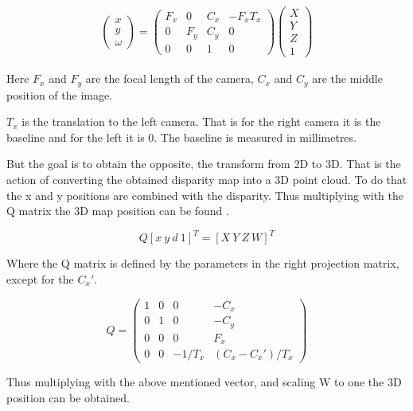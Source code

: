 \begin{equation}\label{eq:projection}
 \begin{split}
  \begin{pmatrix}
   x \\
   y \\
   \omega 
  \end{pmatrix}	
  = 
  \begin{pmatrix}
    F_{x} & 0 & C_{x} & -F_{x}T_{x} \\
    0 & F_{y} & C_{y} & 0 \\
    0 & 0 & 1 & 0
  \end{pmatrix}
  \begin{pmatrix}
   X \\
   Y \\
   Z \\
   1 
  \end{pmatrix}	
 \end{split}
\end{equation}  


Here $F_{x}$ and $F_{y}$ are the focal length of the camera, $C_{x}$ and $C_{y}$ are the middle position of the image.

$T_{x}$ is the translation to the left camera. That is for the right camera it is the baseline and for the left it is 0. The baseline is measured in millimetres. 

But the goal is to obtain the opposite, the transform from 2D to 3D. That is the action of converting the obtained disparity map into a 3D point cloud. To do that the x and y positions are combined with the disparity. Thus multiplying with the Q matrix the 3D map position can be found \cite{springer}.

\[ Q [ x \ y \ d \ 1 ]^{T} = [ X \ Y \ Z \ W ]^{T} \]

Where the Q matrix is defined by the parameters in the right projection matrix, except for the $C_{x}'$.

\[
Q =
 \begin{pmatrix}
  1 & 0 & 0 & -C_{x} \\
  0 & 1 & 0 & -C_{y} \\
  0 & 0 & 0 & F_{x} \\
  0 & 0 & -1/T_{x} & (C_{x}-C_{x}')/T_{x} 
 \end{pmatrix}
\]

Thus multiplying with the above mentioned vector, and scaling W to one the 3D position can be obtained.

